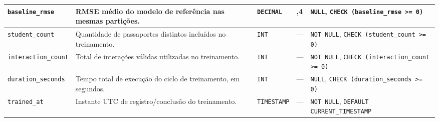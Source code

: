 \begin{anexosenv}
{\begin{longtable}{>{\raggedright\arraybackslash}p{3.0cm}>{\raggedright\arraybackslash}p{4.9cm}>{\raggedright\arraybackslash}p{1.75cm}>{\centering\arraybackslash}p{0.95cm}>{\raggedright\arraybackslash}p{3.7cm}}
\hline
\texttt{baseline\_\allowbreak rmse} & RMSE médio do modelo de referência nas mesmas partições. & \texttt{DECIMAL} & 5,4 & \texttt{NULL}, \texttt{CHECK (baseline\_\allowbreak rmse >= 0)} \\
\hline
\texttt{student\_\allowbreak count} & Quantidade de passaportes distintos incluídos no treinamento. & \texttt{INT} & --- & \texttt{NOT NULL}, \texttt{CHECK (student\_\allowbreak count >= 0)} \\
\hline
\texttt{interaction\_\allowbreak count} & Total de interações válidas utilizadas no treinamento. & \texttt{INT} & --- & \texttt{NOT NULL}, \texttt{CHECK (interaction\_\allowbreak count >= 0)} \\
\hline
\texttt{duration\_\allowbreak seconds} & Tempo total de execução do ciclo de treinamento, em segundos. & \texttt{INT} & --- & \texttt{NULL}, \texttt{CHECK (duration\_\allowbreak seconds >= 0)} \\
\hline
\texttt{trained\_\allowbreak at} & Instante UTC de registro/conclusão do treinamento. & \texttt{TIMESTAMP} & --- & \texttt{NOT NULL}, \texttt{DEFAULT CURRENT\_\allowbreak TIMESTAMP} \\
\hline
\end{longtable}

}
\end{anexosenv}
